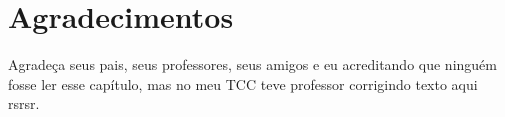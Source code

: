 \chapter*{Agradecimentos}

Agradeça seus pais, seus professores, seus amigos e eu acreditando que ninguém fosse ler esse capítulo, mas no meu TCC teve professor corrigindo texto aqui rsrsr.